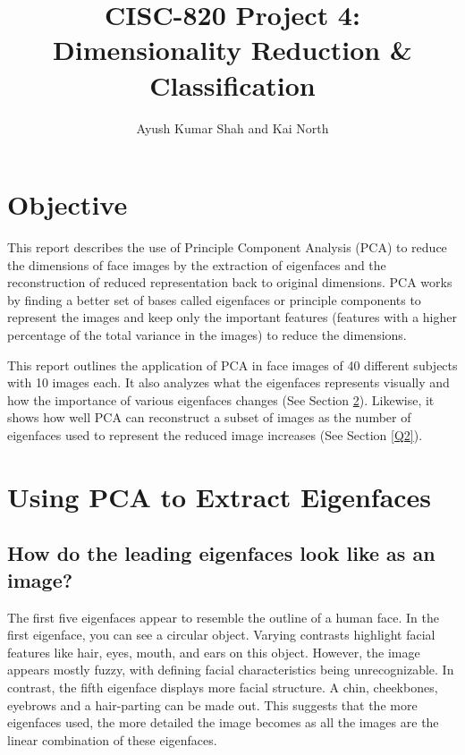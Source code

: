 \documentclass[letterpaper,12pt]{article}
\begin{document}
\title{{\myfont CISC-820 Project 4: Dimensionality Reduction \& Classification}}

\author{\myfont Ayush Kumar Shah and Kai North}
\date{}
\maketitle

\section{Objective}\label{intro}

This report describes the use of Principle Component Analysis (PCA) to reduce the dimensions of face images by the extraction of eigenfaces and the reconstruction of reduced representation back to original dimensions. PCA works by finding a better set of bases called eigenfaces or principle components to represent the images and keep only the important features (features with a higher percentage of the total variance in the images) to reduce the dimensions.

This report outlines the application of PCA in face images of 40 different subjects with 10 images each. It also analyzes what the eigenfaces represents visually and how the importance of various eigenfaces changes (See Section \ref{Q1}). Likewise, it shows how well PCA can reconstruct a subset of images as the number of eigenfaces used to represent the reduced image increases (See Section \ref{Q2}).

\section{Using PCA to Extract Eigenfaces}\label{Q1}


\subsection{How do the leading eigenfaces look like as an image?}\label{Q1.1}

The first five eigenfaces appear to resemble the outline of a human face. In the first eigenface, you can see a circular object. Varying contrasts highlight facial features like hair, eyes, mouth, and ears on this object. However, the image appears mostly fuzzy, with defining facial characteristics being unrecognizable. In contrast, the fifth eigenface displays more facial structure. A chin, cheekbones, eyebrows and a hair-parting can be made out. This suggests that the more eigenfaces used, the more detailed the image becomes as all the images are the linear combination of these eigenfaces.
\end{document}
